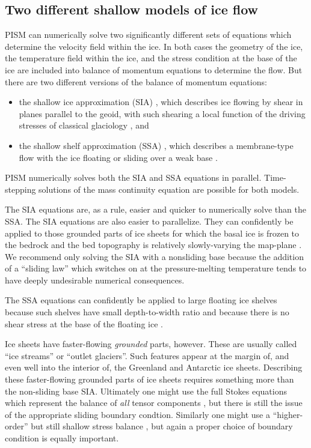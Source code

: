 \documentclass[11pt,final]{amsart}
\begin{document}
\subsection{Two different shallow models of ice flow}  PISM can numerically solve two significantly different sets of equations which determine the velocity field within the ice.  In both cases the geometry of the ice, the temperature field within the ice, and the stress condition at the base of the ice are included into balance of momentum equations to determine the flow.  But there are two different versions of the balance of momentum equations:\begin{itemize}
\item the shallow ice approximation (SIA) \cite{Hutter}, which describes ice flowing by shear in planes parallel to the geoid, with such shearing a local function of the driving stresses of classical glaciology \cite{Paterson}, and
\item the shallow shelf approximation (SSA) \cite{WeisGreveHutter}, which describes a membrane-type flow with the ice floating or sliding over a weak base \cite{Morland,MacAyeal,SchoofStream}.
\end{itemize}
PISM numerically solves both the SIA and SSA equations in parallel.  Time-stepping solutions of the mass continuity equation are possible for both models.

The SIA equations are, as a rule, easier and quicker to numerically solve than the SSA.  The SIA equations are also easier to parallelize.  They can confidently be applied to those grounded parts of ice sheets for which the basal ice is frozen to the bedrock and the bed topography is relatively slowly-varying the map-plane \cite{Fowler}.  We recommend only solving the SIA with a nonsliding base because the addition of a ``sliding law'' which switches on at the pressure-melting temperature tends to have deeply undesirable numerical consequences.

The SSA equations can confidently be applied to large floating ice shelves because such shelves have small depth-to-width ratio and because there is no shear stress at the base of the floating ice \cite{Morland,MorlandZainuddin}.

Ice sheets have faster-flowing \emph{grounded} parts, however.  These are usually called ``ice streams'' or ``outlet glaciers''.  Such features appear at the margin of, and even well into the interior of, the Greenland \cite{Joughinetal2001} and Antarctic \cite{BamberVaughanJoughin} ice sheets.  Describing these faster-flowing grounded parts of ice sheets requires something more than the non-sliding base SIA.  Ultimately one might use the full Stokes equations which represent the balance of \emph{all} tensor components \cite{Fowler}, but there is still the issue of the appropriate sliding boundary condtion.  Similarly one might use a ``higher-order'' but still shallow stress balance \cite{Blatter,Pattyn03}, but again a proper choice of boundary condition is equally important.
\end{document}

